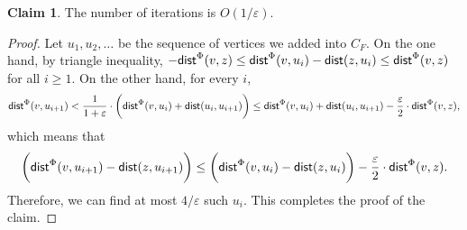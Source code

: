 \documentclass[11pt]{article}
\theoremstyle{definition}
\newtheorem{claim}[theorem]{Claim}
\newcommand{\eps}{{\varepsilon}}
\newcommand{\dist}{\textnormal{\textsf{dist}}}
\begin{document}
\begin{claim}
The number of iterations  is $O(1/\eps)$.
\end{claim}
\begin{proof}
Let $u_1,u_2,\ldots$ be the sequence of vertices we added into $C_F$. On the one hand, by triangle inequality, $-\dist^{\Phi}(v,z)\le \dist^{\Phi}(v,u_i)-\dist(z,u_i)\le \dist^{\Phi}(v,z)$  for all $i\ge 1$. On the other hand, for every $i$, 
$$\dist^{\Phi}(v,u_{i+1})<\frac{1}{1+\eps}\cdot \bigg(\dist^{\Phi}(v,u_i)+\dist(u_i,u_{i+1})\bigg)\le \dist^{\Phi}(v,u_i)+\dist(u_i,u_{i+1})-\frac{\eps}{2}\cdot \dist^{\Phi}(v,z),$$
which means that
\[
\bigg(\dist^{\Phi}(v,u_{i+1})-\dist(z,u_{i+1})\bigg)\le \bigg(\dist^{\Phi}(v,u_i)-\dist(z,u_i)\bigg)-\frac{\eps}{2}\cdot \dist^{\Phi}(v,z).
\]
Therefore, we can find at most $4/\eps$ such $u_i$. This completes the proof of the claim.
\end{proof}





 




\end{document}
